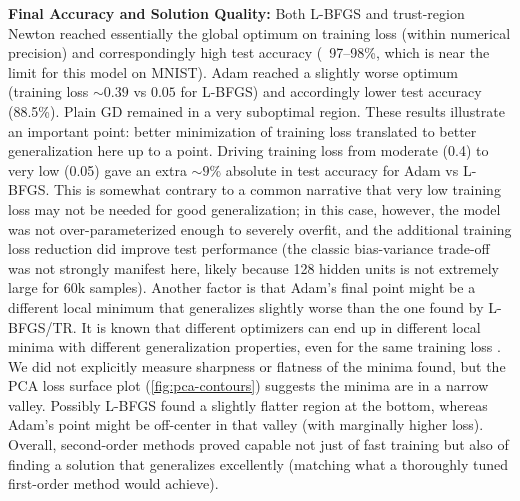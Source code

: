 \documentclass[12pt]{article}
\begin{document}
\textbf{Final Accuracy and Solution Quality:} Both L-BFGS and trust-region Newton reached essentially the global optimum on training loss (within numerical precision) and correspondingly high test accuracy (~97–98\%, which is near the limit for this model on MNIST). Adam reached a slightly worse optimum (training loss $\sim0.39$ vs $0.05$ for L-BFGS) and accordingly lower test accuracy (88.5\%). Plain GD remained in a very suboptimal region. These results illustrate an important point: better minimization of training loss translated to better generalization here up to a point. Driving training loss from moderate (0.4) to very low (0.05) gave an extra $\sim9\%$ absolute in test accuracy for Adam vs L-BFGS. This is somewhat contrary to a common narrative that very low training loss may not be needed for good generalization; in this case, however, the model was not over-parameterized enough to severely overfit, and the additional training loss reduction did improve test performance (the classic bias-variance trade-off was not strongly manifest here, likely because 128 hidden units is not extremely large for 60k samples). Another factor is that Adam’s final point might be a different local minimum that generalizes slightly worse than the one found by L-BFGS/TR. It is known that different optimizers can end up in different local minima with different generalization properties, even for the same training loss \cite{Keskar2017sharp}. We did not explicitly measure sharpness or flatness of the minima found, but the PCA loss surface plot (\cref{fig:pca-contours}) suggests the minima are in a narrow valley. Possibly L-BFGS found a slightly flatter region at the bottom, whereas Adam’s point might be off-center in that valley (with marginally higher loss). Overall, second-order methods proved capable not just of fast training but also of finding a solution that generalizes excellently (matching what a thoroughly tuned first-order method would achieve).
\end{document}

